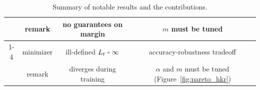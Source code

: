 \begin{table}
\begin{threeparttable}
\begin{tabular}{cccc}
                & remark & no guarantees on margin & $m$ must be tuned\\
                \cmidrule(r){1-4}
                \multirow{2}{*}{HKR $\Loss^{hkr}_{m,\alpha}$} & minimizer & ill-defined $L_t\veryshortarrow\infty$ & accuracy-robustness tradeoff\\
                & remark & diverges during training & $\alpha$ and $m$ must be tuned (Figure~\ref{fig:pareto_hkr})\\
                \bottomrule
            \end{tabular}
        \end{threeparttable}
        \smallskip
        \caption{
        Summary of notable results and the contributions.
        }
    \label{tab:bcesummary}\end{table} 



